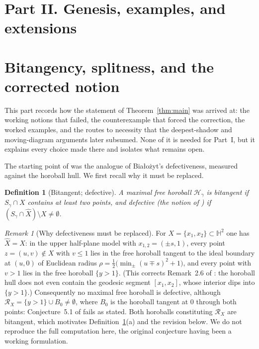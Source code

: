 \documentclass[11pt]{article}
\newtheorem{definition}[theorem]{Definition}
\theoremstyle{remark}
\newtheorem{remark}[theorem]{Remark}
\newcommand{\X}{X}
\newcommand{\Xhat}{\widehat{\X}}
\newcommand{\Rx}{\mathcal{R}_{\X}}
\newcommand{\Hb}[1]{\mathcal{H}_{#1}}
\newcommand{\Sb}[1]{S_{#1}}
\newcommand{\B}{B}
\begin{document}
\section*{Part II. Genesis, examples, and extensions}

\section{Bitangency, splitness, and the corrected notion}\label{sec:taxonomy}

This part records how the statement of
Theorem~\ref{thm:main} was arrived at: the working notions that failed,
the counterexample that forced the correction, the worked examples, and
the routes to necessity that the deepest-shadow and moving-diagram
arguments later subsumed. None of it is needed for Part~I, but it
explains every choice made there and isolates what remains open.

The starting point of \cite{R1} was the analogue of Bia\l{}o\.zyt's
defectiveness, measured against the horoball hull. We first recall why it
must be replaced.

\begin{definition}[Bitangent; defective]\label{def:bitangent}
A maximal free horoball $\Hb{\gamma}$ is \emph{bitangent} if
$\Sb{\gamma}\cap\X$ contains at least two points, and \emph{defective}
(the notion of \cite[Def.~2.5]{R1}) if
$(\Sb{\gamma}\cap\Xhat)\setminus\X\neq\emptyset$.
\end{definition}

\begin{remark}[Why defectiveness must be replaced]
\label{rem:collapse}
For $\X=\{x_{1},x_{2}\}\subset\mathbb{H}^{2}$ one has $\Xhat=\X$: in
the upper half-plane model with $x_{1,2}=(\pm s,1)$, every point
$z=(u,v)\notin\X$ with $v\le 1$ lies in the free horoball tangent to
the ideal boundary at $(u,0)$ of Euclidean radius
$\rho=\tfrac12\bigl(\min_{\pm}(u\mp s)^{2}+1\bigr)$, and every point
with $v>1$ lies in the free horoball $\{y>1\}$. (This corrects
Remark~2.6 of \cite{R1}: the horoball hull does not even contain the
geodesic segment $[x_{1},x_{2}]$, whose interior dips into
$\{y>1\}$.) Consequently no maximal free horoball is defective,
although $\Rx=\{y>1\}\cup\B_{0}\neq\emptyset$, where $\B_{0}$ is the
horoball tangent at $0$ through both points: Conjecture~5.1 of
\cite{R1} fails as stated. Both horoballs constituting $\Rx$ are
bitangent, which motivates Definition~\ref{def:bitangent}(a) and the
revision below. We do not reproduce the full computation here, the
original conjecture having been a working formulation.
\end{remark}
\end{document}
